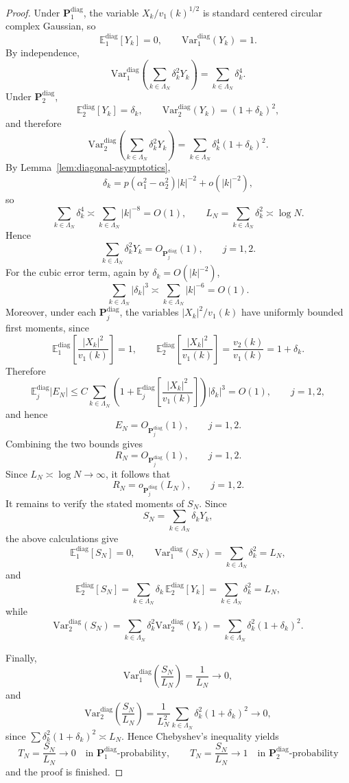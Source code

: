 \documentclass[10pt,a4paper]{amsart}
\newcommand{\E}{\mathbb{E}}
\newcommand{\Var}{\mathrm{Var}}
\begin{document}
\begin{proof}
Under \(\mathbf P_1^{\mathrm{diag}}\), the variable \(X_k/v_1(k)^{1/2}\) is
standard centered circular complex Gaussian, so
\[
\E_1^{\mathrm{diag}}[Y_k]=0,
\qquad
\Var_1^{\mathrm{diag}}(Y_k)=1.
\]
By independence,
\[
\Var_1^{\mathrm{diag}}\!\left(\sum_{k\in\Lambda_N}\delta_k^2Y_k\right)
=
\sum_{k\in\Lambda_N}\delta_k^4.
\]
Under \(\mathbf P_2^{\mathrm{diag}}\),
\[
\E_2^{\mathrm{diag}}[Y_k]=\delta_k,
\qquad
\Var_2^{\mathrm{diag}}(Y_k)=(1+\delta_k)^2,
\]
and therefore
\[
\Var_2^{\mathrm{diag}}\!\left(\sum_{k\in\Lambda_N}\delta_k^2Y_k\right)
=
\sum_{k\in\Lambda_N}\delta_k^4(1+\delta_k)^2.
\]
By Lemma~\ref{lem:diagonal-asymptotics},
\[
\delta_k=p(\alpha_1^2-\alpha_2^2)|k|^{-2}+o(|k|^{-2}),
\]
so
\[
\sum_{k\in\Lambda_N}\delta_k^4
\asymp
\sum_{k\in\Lambda_N}|k|^{-8}
=O(1),
\qquad
L_N=\sum_{k\in\Lambda_N}\delta_k^2\asymp \log N.
\]
Hence
\[
\sum_{k\in\Lambda_N}\delta_k^2Y_k
=
O_{\mathbf P_j^{\mathrm{diag}}}(1),
\qquad j=1,2.
\]
For the cubic error term, again by \(\delta_k=O(|k|^{-2})\),
\[
\sum_{k\in\Lambda_N}|\delta_k|^3
\asymp
\sum_{k\in\Lambda_N}|k|^{-6}
=
O(1).
\]
Moreover, under each \(\mathbf P_j^{\mathrm{diag}}\), the variables
\(|X_k|^2/v_1(k)\) have uniformly bounded first moments, since
\[
\E_1^{\mathrm{diag}}\!\left[\frac{|X_k|^2}{v_1(k)}\right]=1,
\qquad
\E_2^{\mathrm{diag}}\!\left[\frac{|X_k|^2}{v_1(k)}\right]
=
\frac{v_2(k)}{v_1(k)}=1+\delta_k.
\]
Therefore
\[
\E_j^{\mathrm{diag}}|E_N|
\le
C\sum_{k\in\Lambda_N}
\left(1+\E_j^{\mathrm{diag}}\!\left[\frac{|X_k|^2}{v_1(k)}\right]\right)|\delta_k|^3
=O(1),
\qquad j=1,2,
\]
and hence
\[
E_N=O_{\mathbf P_j^{\mathrm{diag}}}(1),
\qquad j=1,2.
\]
Combining the two bounds gives
\[
R_N=O_{\mathbf P_j^{\mathrm{diag}}}(1),
\qquad j=1,2.
\]
Since \(L_N\asymp \log N\to\infty\), it follows that
\[
R_N=o_{\mathbf P_j^{\mathrm{diag}}}(L_N),
\qquad j=1,2.
\]
It remains to verify the stated moments of \(S_N\). Since
\[
S_N=\sum_{k\in\Lambda_N}\delta_kY_k,
\]
the above calculations give
\[
\E_1^{\mathrm{diag}}[S_N]=0,
\qquad
\Var_1^{\mathrm{diag}}(S_N)=\sum_{k\in\Lambda_N}\delta_k^2=L_N,
\]
and
\[
\E_2^{\mathrm{diag}}[S_N]
=
\sum_{k\in\Lambda_N}\delta_k\,\E_2^{\mathrm{diag}}[Y_k]
=
\sum_{k\in\Lambda_N}\delta_k^2
=
L_N,
\]
while
\[
\Var_2^{\mathrm{diag}}(S_N)
=
\sum_{k\in\Lambda_N}\delta_k^2\Var_2^{\mathrm{diag}}(Y_k)
=
\sum_{k\in\Lambda_N}\delta_k^2(1+\delta_k)^2.
\]

Finally,
\[
\Var_1^{\mathrm{diag}}\!\left(\frac{S_N}{L_N}\right)=\frac1{L_N}\to0,
\]
and
\[
\Var_2^{\mathrm{diag}}\!\left(\frac{S_N}{L_N}\right)
=
\frac{1}{L_N^2}\sum_{k\in\Lambda_N}\delta_k^2(1+\delta_k)^2
\to0,
\]
since \(\sum \delta_k^2(1+\delta_k)^2\asymp L_N\). Hence Chebyshev's inequality
yields
\[
T_N=\frac{S_N}{L_N}\to 0
\quad\text{in \(\mathbf P_1^{\mathrm{diag}}\)-probability},
\qquad
T_N=\frac{S_N}{L_N}\to 1
\quad\text{in \(\mathbf P_2^{\mathrm{diag}}\)-probability}
\]
and the proof is finished.
\end{proof}
\end{document}
